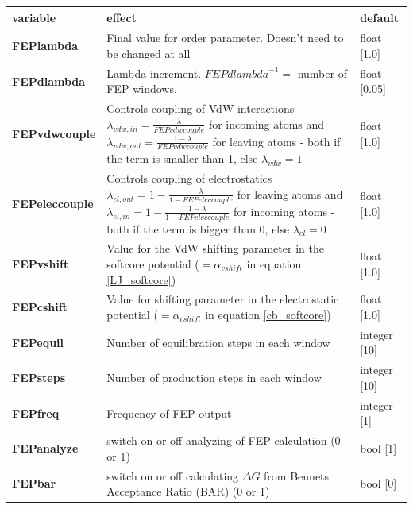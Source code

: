 \documentclass[10pt,a4paper]{article} %
\begin{document}
	\begin{longtable}{|p{3cm}|p{5cm}|p{3cm}|}
		variable & effect & default \\
		\hline
		\textbf{FEPlambda} & Final value for order parameter. Doesn't need to be changed at all & float [1.0] \\
		\textbf{FEPdlambda} & Lambda increment. ${FEPdlambda}^{-1} =$ number of \ac{FEP} windows.	& float [0.05] \\
		\textbf{FEPvdwcouple} & Controls coupling of \ac{VdW} interactions $\lambda_{vdw,in} = \frac{\lambda}{FEPvdwcouple}$ for incoming atoms and $\lambda_{vdw,out} = \frac{1-\lambda}{FEPvdwcouple}$ for leaving atoms - both if the term is smaller than 1, else $\lambda_{vdw} = 1$ \supercite{_implementation_????} & float [1.0] \\
		\textbf{FEPeleccouple} & Controls coupling of electrostatics \mbox{$\lambda_{el, out} = 1- \frac{\lambda}{1-FEPeleccouple}$} for leaving atoms and \mbox{$\lambda_{el, in} = 1- \frac{1-\lambda}{1-FEPeleccouple}$} for incoming atoms - both if the term is bigger than 0, else $\lambda_{el} = 0$ \supercite{_implementation_????}
		& float [1.0] \\
		\textbf{FEPvshift} & Value for the \ac{VdW} shifting parameter in the softcore potential ($= \alpha_{vshift}$ in equation \ref{LJ_softcore}) & float [1.0] \\
		\textbf{FEPcshift} & Value for shifting parameter in the electrostatic potential ($= \alpha_{cshift}$ in equation \ref{cb_softcore}) & float [1.0] \\
		\textbf{FEPequil} & Number of equilibration steps in each window & integer [10] \\
		\textbf{FEPsteps} & Number of production steps in each window & integer [10]\\
		\textbf{FEPfreq} & Frequency of \ac{FEP} output & integer [1] \\
		\textbf{FEPanalyze} & switch on or off analyzing of FEP calculation (0 or 1) & bool [1] \\
		\textbf{FEPbar} & switch on or off calculating $\Delta G$ from Bennets Acceptance Ratio (BAR) (0 or 1)  & bool [0] \\
	\end{longtable}
\end{document}

